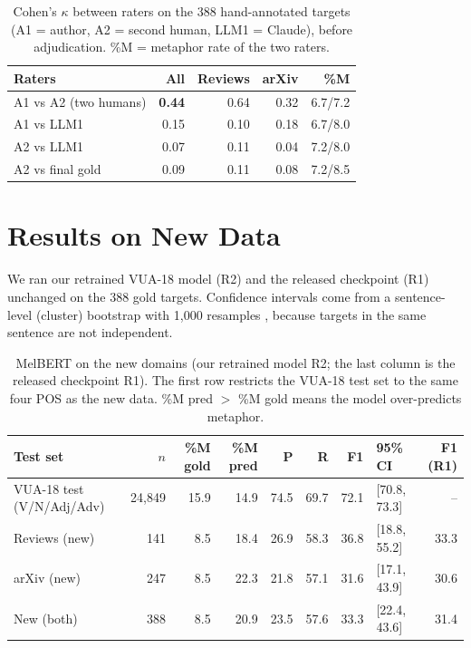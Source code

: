 \documentclass[11pt]{article}
\begin{document}
\begin{table}[t]
\centering\small
\begin{tabular}{lrrrr}
\toprule
Raters & All & Reviews & arXiv & \%M \\
\midrule
A1 vs A2 (two humans) & \textbf{0.44} & 0.64 & 0.32 & 6.7/7.2 \\
A1 vs LLM1 & 0.15 & 0.10 & 0.18 & 6.7/8.0 \\
A2 vs LLM1 & 0.07 & 0.11 & 0.04 & 7.2/8.0 \\
A2 vs final gold & 0.09 & 0.11 & 0.08 & 7.2/8.5 \\
\bottomrule
\end{tabular}
\caption{Cohen's $\kappa$ between raters on the 388 hand-annotated targets (A1 = author, A2 = second human, LLM1 = Claude), before adjudication. \%M = metaphor rate of the two raters.}
\label{tab:agreement}
\end{table}

\section{Results on New Data}
\label{sec:results}

We ran our retrained VUA-18 model (R2) and the released checkpoint (R1) unchanged on the 388 gold targets. Confidence intervals come from a sentence-level (cluster) bootstrap with 1,000 resamples \citep{efron1993bootstrap}, because targets in the same sentence are not independent.

\begin{table}[t]
\centering\small
\begin{tabular}{lrrrrrrlr}
\toprule
Test set & $n$ & \%M gold & \%M pred & P & R & F1 & 95\% CI & F1 (R1) \\
\midrule
VUA-18 test (V/N/Adj/Adv) & 24,849 & 15.9 & 14.9 & 74.5 & 69.7 & 72.1 & [70.8, 73.3] & -- \\
Reviews (new) & 141 & 8.5 & 18.4 & 26.9 & 58.3 & 36.8 & [18.8, 55.2] & 33.3 \\
arXiv (new) & 247 & 8.5 & 22.3 & 21.8 & 57.1 & 31.6 & [17.1, 43.9] & 30.6 \\
New (both) & 388 & 8.5 & 20.9 & 23.5 & 57.6 & 33.3 & [22.4, 43.6] & 31.4 \\
\bottomrule
\end{tabular}
\caption{MelBERT on the new domains (our retrained model R2; the last column is the released checkpoint R1). The first row restricts the VUA-18 test set to the same four POS as the new data. \%M pred $>$ \%M gold means the model over-predicts metaphor.}
\label{tab:newdata}
\end{table}
\end{document}

